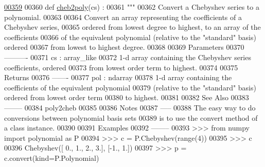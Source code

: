 \begin{DoxyCode}
\hypertarget{namespacepyneb_1_1utils_1_1chebyshev_l00359}{}\hyperlink{namespacepyneb_1_1utils_1_1chebyshev_a0e43853c4c6b0f440005cc6b5124557e}{00359} 
00360 \textcolor{keyword}{def }\hyperlink{namespacepyneb_1_1utils_1_1chebyshev_a0e43853c4c6b0f440005cc6b5124557e}{cheb2poly}(cs) :
00361     \textcolor{stringliteral}{"""}
00362 \textcolor{stringliteral}{    Convert a Chebyshev series to a polynomial.}
00363 \textcolor{stringliteral}{}
00364 \textcolor{stringliteral}{    Convert an array representing the coefficients of a Chebyshev series,}
00365 \textcolor{stringliteral}{    ordered from lowest degree to highest, to an array of the coefficients}
00366 \textcolor{stringliteral}{    of the equivalent polynomial (relative to the "standard" basis) ordered}
00367 \textcolor{stringliteral}{    from lowest to highest degree.}
00368 \textcolor{stringliteral}{}
00369 \textcolor{stringliteral}{    Parameters}
00370 \textcolor{stringliteral}{    ----------}
00371 \textcolor{stringliteral}{    cs : array\_like}
00372 \textcolor{stringliteral}{        1-d array containing the Chebyshev series coefficients, ordered}
00373 \textcolor{stringliteral}{        from lowest order term to highest.}
00374 \textcolor{stringliteral}{}
00375 \textcolor{stringliteral}{    Returns}
00376 \textcolor{stringliteral}{    -------}
00377 \textcolor{stringliteral}{    pol : ndarray}
00378 \textcolor{stringliteral}{        1-d array containing the coefficients of the equivalent polynomial}
00379 \textcolor{stringliteral}{        (relative to the "standard" basis) ordered from lowest order term}
00380 \textcolor{stringliteral}{        to highest.}
00381 \textcolor{stringliteral}{}
00382 \textcolor{stringliteral}{    See Also}
00383 \textcolor{stringliteral}{    --------}
00384 \textcolor{stringliteral}{    poly2cheb}
00385 \textcolor{stringliteral}{}
00386 \textcolor{stringliteral}{    Notes}
00387 \textcolor{stringliteral}{    -----}
00388 \textcolor{stringliteral}{    The easy way to do conversions between polynomial basis sets}
00389 \textcolor{stringliteral}{    is to use the convert method of a class instance.}
00390 \textcolor{stringliteral}{}
00391 \textcolor{stringliteral}{    Examples}
00392 \textcolor{stringliteral}{    --------}
00393 \textcolor{stringliteral}{    >>> from numpy import polynomial as P}
00394 \textcolor{stringliteral}{    >>> c = P.Chebyshev(range(4))}
00395 \textcolor{stringliteral}{    >>> c}
00396 \textcolor{stringliteral}{    Chebyshev([ 0.,  1.,  2.,  3.], [-1.,  1.])}
00397 \textcolor{stringliteral}{    >>> p = c.convert(kind=P.Polynomial)}

\end{DoxyCode}
